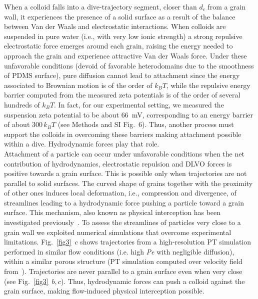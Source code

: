 \documentclass[singlecolumn,pre,notitlepage,preprintnumbers,floatfix,superscriptaddress]{revtex4-1}
\begin{document}
\noindent
When a colloid falls into a dive-trajectory segment, closer than $d_c$ from a grain wall, it experiences the presence of a solid surface as a result of the balance between Van der Waals and electrostatic interactions. When colloids are suspended in pure water (i.e., with very low ionic strength) a strong repulsive electrostatic force emerges around each grain, raising the energy needed to approach the grain and experience attractive Van der Waals force. Under these unfavorable conditions (devoid of favorable heterodomains due to the smoothness of PDMS surface), pure diffusion cannot lead to attachment since the energy associated to Brownian motion is of the order of $k_BT$, while the repulsive energy barrier computed from the measured zeta potentials is of the order of several hundreds of $k_BT$. In fact, for our experimental setting, we measured the suspension zeta potential to be about $66$~mV, corresponding to an energy barrier of about $300 \, k_BT$ (see Methods and SI Fig.~6). Thus, another process must support the colloids in overcoming these barriers making attachment possible within a dive. Hydrodynamic forces play that role. \\

\noindent
Attachment of a particle can occur under unfavorable conditions when the net contribution of hydrodynamics, electrostatic repulsion and DLVO forces is positive towards a grain surface. This is possible only when trajectories are not parallel to solid surfaces. The curved shape of grains together with the proximity of other ones induces local deformation, i.e., compression and divergence, of streamlines leading to a hydrodynamic force pushing a particle toward a grain surface. This mechanism, also known as physical interception has been investigated previously~\cite{Herve2015,pradel_EST_2024}. To assess the streamlines of particles very close to a grain wall we exploited numerical simulations that overcome experimental limitations. Fig.~\ref{fig3}~$c$ shows trajectories from a high-resolution PT simulation performed in similar flow conditions (i.e. high \textit{Pe} with negligible diffusion), within a similar porous structure (PT simulation computed over velocity field from~\cite{deAnnaPRF2017}). Trajectories are never parallel to a grain surface even when very close (see Fig.~\ref{fig3}~$b,c$). Thus, hydrodynamic forces can push a colloid against the grain surface, making flow-induced physical interception possible. \\
\end{document}
